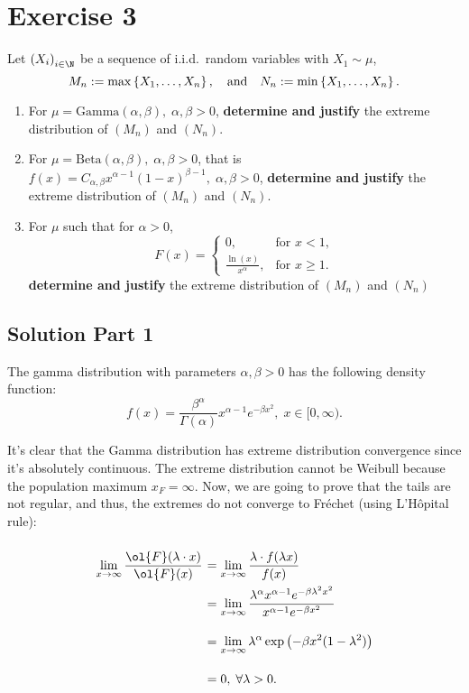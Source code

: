\section{Exercise 3}

Let ${(X_i)}_{i\in\N}$ be a sequence of i.i.d.~random variables with $X_1 \sim \mu$,
\[ M_n := \max\left\{ X_1,\ldots, X_n \right\},\hspace*{1em} \mbox{and} \hspace*{1em} N_n := \min\left\{ X_1,\ldots,X_n \right\}. \]
\begin{enumerate}
    \item For $\mu = \mbox{Gamma}(\alpha,\beta),\; \alpha,\beta > 0$, \textbf{determine and justify} the extreme distribution of $(M_n)$ and $(N_n)$.
    \item For $\mu = \mbox{Beta}(\alpha,\beta),\; \alpha,\beta > 0$, that is $f(x) = C_{\alpha,\beta}x^{\alpha-1}{(1-x)}^{\beta -1},\; \alpha,\beta > 0$, \textbf{determine and justify} the extreme distribution of $(M_n)$ and $(N_n)$.
    \item For $\mu$ such that for $\alpha > 0$,
    \[ F(x) = \begin{cases}
    0, & \mbox{for }x< 1,\\
    \frac{\ln(x)}{x^\alpha}, & \mbox{for }x\geq 1.
    \end{cases} \]
    \textbf{determine and justify} the extreme distribution of $(M_n)$ and $(N_n)$
\end{enumerate}

\subsection*{Solution Part 1}

The gamma distribution with parameters $\alpha, \beta > 0$ has the following density function:
\[ f(x) = \frac{\beta^\alpha}{\Gamma(\alpha)} x^{\alpha - 1} e^{-\beta x^2}, \; x \in [0,\infty). \] %

It's clear that the Gamma distribution has extreme distribution convergence since it's absolutely continuous. The extreme distribution cannot be Weibull because the population maximum $x_F = \infty$. Now, we are going to prove that the tails are not regular, and thus, the extremes do not converge to Fréchet (using L'Hôpital rule):

\[ \everymath{\displaystyle}
\arraycolsep=1.8pt\def\arraystretch{2.5}
\begin{array}{rl}
    \lim_{x\to\infty} \frac{\ol{F}(\lambda \cdot x)}{\ol{F}(x)} & = \lim_{x\to\infty} \frac{\lambda \cdot f(\lambda x)}{f(x)}\\
    & = \lim_{x\to\infty} \frac{\lambda^{\alpha} x^{\alpha -1 } e^{-\beta \lambda^2 x^2}}{x^{\alpha - 1} e^{-\beta x^2}}\\
    & = \lim_{x\to\infty} \lambda^{\alpha} \exp\left( -\beta x^2 (1-\lambda^2)  \right)\\
    & = 0,\; \forall \lambda > 0.
\end{array} \]

